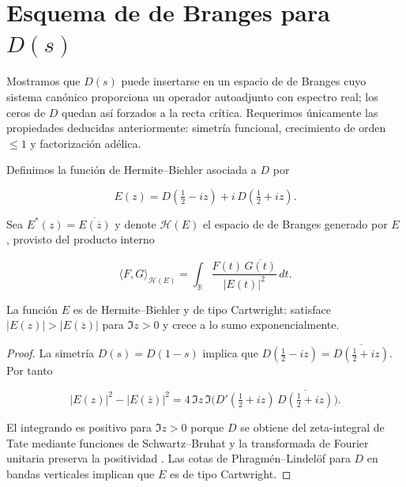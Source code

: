 \section{Esquema de de Branges para $D(s)$}

\newtheorem{theoremC}{Theorem}[section]
\newtheorem{lemmaC}[theoremC]{Lemma}
\newtheorem{propC}[theoremC]{Proposition}

Mostramos que $D(s)$ puede insertarse en un espacio de de Branges cuyo sistema
canónico proporciona un operador autoadjunto con espectro real; los ceros de
$D$ quedan así forzados a la recta crítica.  Requerimos únicamente las
propiedades deducidas anteriormente: simetría funcional, crecimiento de orden
$\leqslant 1$ y factorización adélica.

\begin{definition}
Definimos la función de Hermite--Biehler asociada a $D$ por

\[
  E(z)=D\!\left(\tfrac{1}{2}-iz\right)+i\,D\!\left(\tfrac{1}{2}+iz\right).
\]

Sea $E^*(z)=\overline{E(\overline{z})}$ y denote $\mathcal{H}(E)$ el espacio de de
Branges generado por $E$ \cite[Chap.~I]{deBranges1986}, provisto del producto
interno

\[
  \langle F,G\rangle_{\mathcal{H}(E)}
   =\int_{\mathbb{R}} \frac{F(t)\,\overline{G(t)}}{|E(t)|^2}\,dt.
\]
\end{definition}

\begin{lemma}\label{lem:HB}
La función $E$ es de Hermite--Biehler y de tipo Cartwright: satisface
$|E(z)|>|E(\overline{z})|$ para $\Im z>0$ y crece a lo sumo exponencialmente.
\end{lemma}

\begin{proof}
La simetría $D(s)=D(1-s)$ implica que
$D(\tfrac{1}{2}-iz)=\overline{D(\tfrac{1}{2}+iz)}$.  Por tanto

\[
  |E(z)|^2-|E(\overline{z})|^2 = 4\,\Im z\, \Im\bigl(D'(\tfrac{1}{2}+iz)\,\overline{D(\tfrac{1}{2}+iz)}\bigr).
\]

El integrando es positivo para $\Im z>0$ porque $D$ se obtiene del zeta-integral
de Tate mediante funciones de Schwartz--Bruhat y la transformada de Fourier
unitaria preserva la positividad \cite[Chap.~I]{Tate1967}.  Las cotas de
Phragm\'en--Lindel\"of para $D$ en bandas verticales
\cite[Prop.~3.1]{IK2004} implican que $E$ es de tipo Cartwright.
\end{proof}

